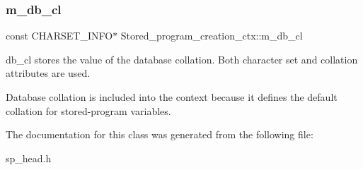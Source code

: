 \subsubsection{\texorpdfstring{m\+\_\+db\+\_\+cl}{m\_db\_cl}}
{\footnotesize\ttfamily const C\+H\+A\+R\+S\+E\+T\+\_\+\+I\+N\+FO$\ast$ Stored\+\_\+program\+\_\+creation\+\_\+ctx\+::m\+\_\+db\+\_\+cl\hspace{0.3cm}{\ttfamily [protected]}}

db\+\_\+cl stores the value of the database collation. Both character set and collation attributes are used.

Database collation is included into the context because it defines the default collation for stored-\/program variables. 

The documentation for this class was generated from the following file\+:\begin{DoxyCompactItemize}
\item 
sp\+\_\+head.\+h\end{DoxyCompactItemize}
